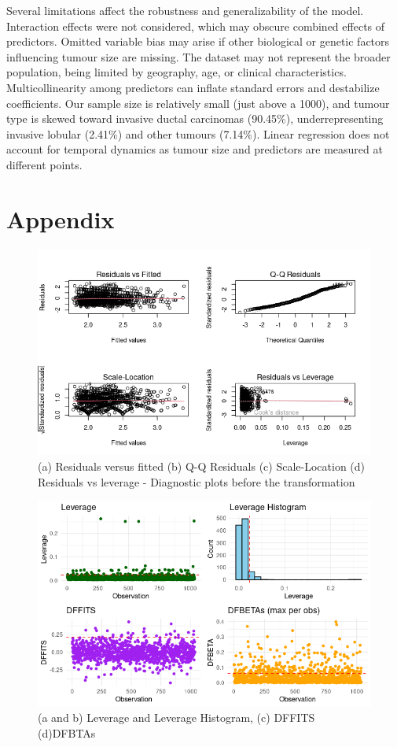 \documentclass[letter]{article}
\begin{document}
Several limitations affect the robustness and generalizability of the model. Interaction effects were not considered, which may obscure combined effects of predictors. Omitted variable bias may arise if other biological or genetic factors influencing tumour size are missing. 
The dataset may not represent the broader population, being limited by geography, age, or clinical characteristics. Multicollinearity among predictors can inflate standard errors and destabilize coefficients. 
Our sample size is relatively small (just above a 1000), and tumour type is skewed toward invasive ductal carcinomas (90.45\%), underrepresenting invasive lobular (2.41\%) and other tumours (7.14\%). 
Linear regression does not account for temporal dynamics as tumour size and predictors are measured at different points.

\newpage

\section{Appendix}

\begin{figure}[hbt!]
        \centering
        \includegraphics[width=\textwidth]{pre_initial.png}
        \caption{(a) Residuals versus fitted (b) Q-Q Residuals (c) Scale-Location (d) Residuals vs leverage - Diagnostic plots before the transformation}
\end{figure}

\begin{figure}[hbt!]
        \centering
        \includegraphics[width=\textwidth]{Leverage_DFBTA.png}
        \caption{(a and b) Leverage and Leverage Histogram, (c) DFFITS (d)DFBTAs}
\end{figure}
\end{document}
